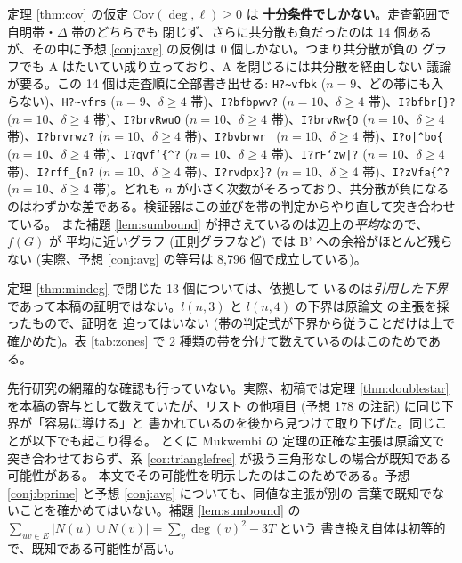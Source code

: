 \documentclass[paper=a4,fontsize=10.5pt,jafontsize=10.5pt]{jlreq}
\theoremstyle{plain}
\theoremstyle{definition}
\begin{document}
定理 \ref{thm:cov} の仮定 $\mathrm{Cov}(\deg, \ell) \ge 0$ は
\textbf{十分条件でしかない}。走査範囲で自明帯・$\Delta$ 帯のどちらでも
閉じず、さらに共分散も負だったのは 14 個あるが、その中に予想
\ref{conj:avg} の反例は 0 個しかない。つまり共分散が負の
グラフでも A はたいてい成り立っており、A を閉じるには共分散を経由しない
議論が要る。この 14 個は走査順に全部書き出せる: \texttt{H?\textasciitilde{}vfbk} ($n = 9$、どの帯にも入らない)、\texttt{H?\textasciitilde{}vfrs} ($n = 9$、$\delta \ge 4$ 帯)、\texttt{I?bfbpwv?} ($n = 10$、$\delta \ge 4$ 帯)、\texttt{I?bfbr[\}?} ($n = 10$、$\delta \ge 4$ 帯)、\texttt{I?brvRwuO} ($n = 10$、$\delta \ge 4$ 帯)、\texttt{I?brvRw\{O} ($n = 10$、$\delta \ge 4$ 帯)、\texttt{I?brvrwz?} ($n = 10$、$\delta \ge 4$ 帯)、\texttt{I?bvbrwr\_} ($n = 10$、$\delta \ge 4$ 帯)、\texttt{I?o|\textasciicircum{}bo\{\_} ($n = 10$、$\delta \ge 4$ 帯)、\texttt{I?qvf`\{\textasciicircum{}?} ($n = 10$、$\delta \ge 4$ 帯)、\texttt{I?rF`zw|?} ($n = 10$、$\delta \ge 4$ 帯)、\texttt{I?rff\_\{n?} ($n = 10$、$\delta \ge 4$ 帯)、\texttt{I?rvdpx\}?} ($n = 10$、$\delta \ge 4$ 帯)、\texttt{I?zVfa\{\textasciicircum{}?} ($n = 10$、$\delta \ge 4$ 帯)。どれも $n$ が小さく次数がそろっており、共分散が負になるのはわずかな差である。検証器はこの並びを帯の判定からやり直して突き合わせている。
また補題
\ref{lem:sumbound} が押さえているのは辺上の\emph{平均}なので、$f(G)$ が
平均に近いグラフ (正則グラフなど) では B' への余裕がほとんど残らない
(実際、予想 \ref{conj:avg} の等号は 8,796 個で成立している)。

定理 \ref{thm:mindeg} で閉じた 13 個については、依拠して
いるのは\emph{引用した下界}であって本稿の証明ではない。$l(n,3)$ と
$l(n,4)$ の下界は原論文 \cite{storer,kw1991} の主張を採ったもので、証明を
追ってはいない (帯の判定式が下界から従うことだけは上で確かめた)。表
\ref{tab:zones} で 2 種類の帯を分けて数えているのはこのためである。

先行研究の網羅的な確認も行っていない。実際、初稿では定理
\ref{thm:doublestar} を本稿の寄与として数えていたが、リスト
\cite{wowii} の他項目 (予想 178 の注記) に同じ下界が「容易に導ける」と
書かれているのを後から見つけて取り下げた。同じことが以下でも起こり得る。
とくに Mukwembi \cite{mukwembi} の
定理の正確な主張は原論文で突き合わせておらず、系
\ref{cor:trianglefree} が扱う三角形なしの場合が既知である可能性がある。
本文でその可能性を明示したのはこのためである。予想
\ref{conj:bprime} と予想 \ref{conj:avg} についても、同値な主張が別の
言葉で既知でないことを確かめてはいない。補題 \ref{lem:sumbound} の
$\sum_{uv \in E}|N(u) \cup N(v)| = \sum_v \deg(v)^2 - 3T$ という
書き換え自体は初等的で、既知である可能性が高い。
\end{document}
